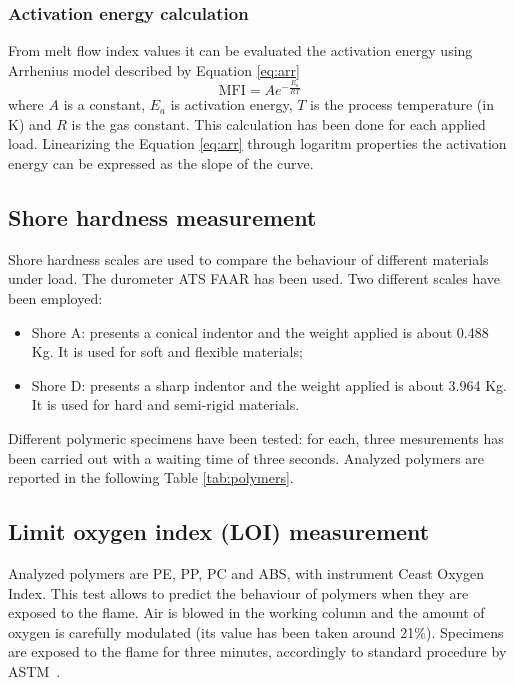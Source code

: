\documentclass[a4paper, 11pt]{article}
\begin{document}
\subsubsection{Activation energy calculation}
From melt flow index values it can be evaluated the activation energy using Arrhenius model described by Equation \ref{eq:arr}
\begin{equation}
\text{MFI} = A e ^{-\frac{E_a}{RT}}
\label{eq:arr}
\end{equation}
where $A$ is a constant, $E_a$ is activation energy, $T$ is the process temperature  (in K) and $R$ is the gas constant. This calculation has been done for each applied load. Linearizing the Equation \ref{eq:arr} through logaritm properties the activation energy can be expressed as the slope of the curve.

\subsection{Shore hardness measurement}

Shore hardness scales are used to compare the behaviour of different materials under load. The durometer ATS FAAR has been used.
Two different scales have been employed:
\begin{itemize}
\item Shore A: presents a conical indentor and the weight applied is about 0.488 Kg. It is used for soft and flexible materials;
\item Shore D: presents a sharp indentor and the weight applied is about 3.964 Kg. It is used for hard and semi-rigid materials.

\end{itemize}

Different polymeric specimens have been tested: for each, three mesurements has been carried out with a waiting time of three seconds. Analyzed polymers are reported in the following Table \ref{tab:polymers}.

\subsection{Limit oxygen index (LOI) measurement}

Analyzed polymers are PE, PP, PC and ABS, with instrument Ceast Oxygen Index. This test allows to predict the behaviour of polymers when they are exposed to the flame. Air is blowed in the working column and the amount of oxygen is carefully modulated (its value has been taken around 21\%). Specimens are exposed to the flame for three minutes, accordingly to standard procedure by ASTM~\cite{LOI}.
\end{document}

